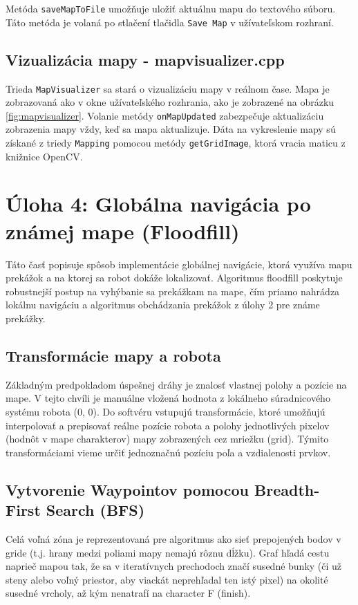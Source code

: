 Metóda \texttt{saveMapToFile} umožňuje uložiť aktuálnu mapu do textového súboru. Táto metóda je volaná po stlačení tlačidla \texttt{Save Map} v užívateľskom rozhraní. 


\subsection{Vizualizácia mapy - mapvisualizer.cpp}

Trieda \texttt{MapVisualizer} sa stará o vizualizáciu mapy v reálnom čase. Mapa je zobrazovaná ako v okne užívateľského rozhrania, ako je zobrazené na obrázku \ref{fig:mapvisualizer}. Volanie metódy \texttt{onMapUpdated} zabezpečuje aktualizáciu zobrazenia mapy vždy, keď sa mapa aktualizuje. Dáta na vykreslenie mapy sú získané z triedy \texttt{Mapping} pomocou metódy \texttt{getGridImage}, ktorá vracia maticu z knižnice OpenCV.



\newpage
\section{Úloha 4: Globálna navigácia po známej mape (Floodfill)}
Táto časť popisuje spôsob implementácie globálnej navigácie, ktorá využíva mapu prekážok a na ktorej sa robot dokáže lokalizovať. Algoritmus floodfill poskytuje robustnejší postup na vyhýbanie sa prekážkam na mape, čím priamo nahrádza lokálnu navigáciu a algoritmus obchádzania prekážok z úlohy 2 pre známe prekážky.

\subsection{Transformácie mapy a robota}
Základným predpokladom úspešnej dráhy je znalosť vlastnej polohy a pozície na mape. V tejto chvíli je manuálne vložená hodnota z lokálneho súradnicového systému robota (0, 0). Do softvéru vstupujú transformácie, ktoré umožňujú interpolovať a prepisovať reálne pozície robota a polohy jednotlivých pixelov (hodnôt v mape charakterov) mapy zobrazených cez mriežku (grid). Týmito transformáciami vieme určiť jednoznačnú pozíciu poľa a vzdialenosti prvkov.

\subsection{Vytvorenie Waypointov pomocou Breadth-First Search (BFS)}

Celá voľná zóna je reprezentovaná pre algoritmus ako sieť prepojených bodov v gride (t.j. hrany medzi poliami mapy nemajú rôznu dĺžku). Graf hľadá cestu naprieč mapou tak, že sa v iteratívnych prechodoch značí susedné bunky (či už steny alebo voľný priestor, aby viackát neprehľadal ten istý pixel) na okolité susedné vrcholy, až kým nenatrafí na character F (finish). 

